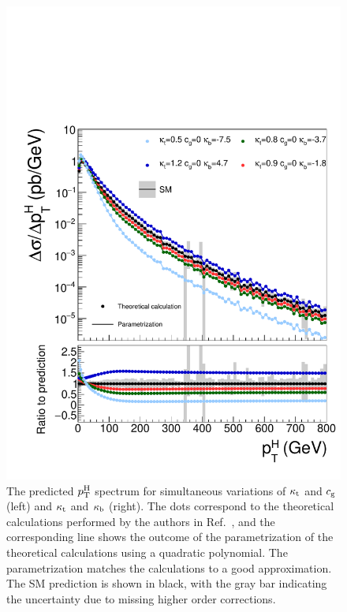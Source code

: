 \begin{figure}[hbtp]
\begin{center}
    \includegraphics[width=\halflinewidth]{img/interpretation/other/varparcomp_ktkb.pdf}
    \caption{
        The predicted $p_\mathrm{T}^\mathrm{H}$ spectrum for simultaneous variations of $\kappa_{\mathrm{t}}$ and $c_\mathrm{g}$ (left) and $\kappa_{\mathrm{t}}$ and $\kappa_{\mathrm{b}}$ (right).
        The dots correspond to the theoretical calculations performed by the authors in Ref.~\cite{Grazzini:2017szg}, and the corresponding line shows the outcome of the parametrization of the theoretical calculations using a quadratic polynomial.
        The parametrization matches the calculations to a good approximation.
        The SM prediction is shown in black, with the gray bar indicating the uncertainty due to missing higher order corrections.
        }
    \label{fig:theories_ktcgkb}
  \end{center}
\end{figure}


